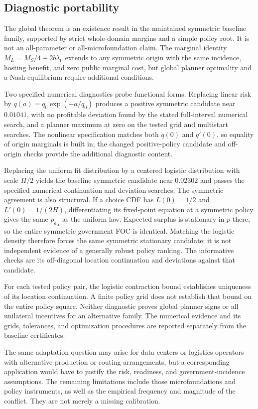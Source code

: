 \subsection{Diagnostic portability}

The global theorem is an existence result in the maintained symmetric baseline family, supported by strict whole-domain margins and a simple policy root. It is not an all-parameter or all-microfoundation claim. The marginal identity $M_L=M_S/4+2b\lambda_0$ extends to any symmetric origin with the same incidence, hosting benefit, and zero public marginal cost, but global planner optimality and a Nash equilibrium require additional conditions.

Two specified numerical diagnostics probe functional forms. Replacing linear risk by $q(a)=q_0\exp(-a/q_0)$ produces a positive symmetric candidate near $0.01041$, with no profitable deviation found by the stated full-interval numerical search, and a planner maximum at zero on the tested grid and multistart searches. The nonlinear specification matches both $q(0)$ and $q'(0)$, so equality of origin marginals is built in; the changed positive-policy candidate and off-origin checks provide the additional diagnostic content.

Replacing the uniform fit distribution by a centered logistic distribution with scale $H/2$ yields the baseline symmetric candidate near $0.02302$ and passes the specified numerical continuation and deviation searches. The symmetric agreement is also structural. If a choice CDF has $L(0)=1/2$ and $L'(0)=1/(2H)$, differentiating its fixed-point equation at a symmetric policy gives the same $p_{a_A}$ as the uniform law. Expected surplus is stationary in $p$ there, so the entire symmetric government FOC is identical. Matching the logistic density therefore forces the same symmetric stationary candidate; it is not independent evidence of a generally robust policy ranking. The informative checks are its off-diagonal location continuation and deviations against that candidate.

For each tested policy pair, the logistic contraction bound establishes uniqueness of its location continuation. A finite policy grid does not establish that bound on the entire policy square. Neither diagnostic proves global planner signs or all unilateral incentives for an alternative family. The numerical evidence and its grids, tolerances, and optimization procedures are reported separately from the baseline certificates.

The same adaptation question may arise for data centers or logistics operators with alternative production or routing arrangements, but a corresponding application would have to justify the risk, readiness, and government-incidence assumptions. The remaining limitations include those microfoundations and policy instruments, as well as the empirical frequency and magnitude of the conflict. They are not merely a missing calibration.
